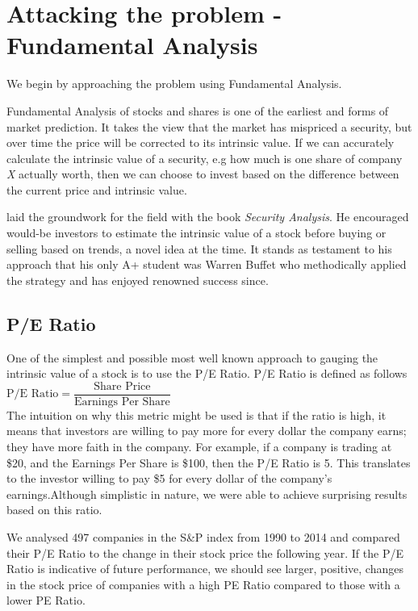 \documentclass{report}
\begin{document}
\section{Attacking the problem - Fundamental Analysis}

We begin by approaching the problem using Fundamental Analysis. 

Fundamental Analysis of stocks and shares is one of the earliest and forms of market prediction. It takes the view that the market has mispriced a security, but over time the price will be corrected to its intrinsic value. If we can accurately calculate the intrinsic value of a security, e.g how much is one share of company \textit{X} actually worth, then we can choose to invest based on the difference between the current price and intrinsic value. 

\citet{graham1934security} laid the groundwork for the field with the book \textit{Security Analysis}. He encouraged would-be investors to estimate the intrinsic value of a stock before buying or selling based on trends, a novel idea at the time. It stands as testament to his approach that his only A+ student was Warren Buffet who methodically applied the strategy and has enjoyed renowned success since. \cite{schroeder2008snowball}

\subsection{P/E Ratio}

One of the simplest and possible most well known approach to gauging the intrinsic value of a stock is to use the P/E Ratio. P/E Ratio is defined as follows\\

\begin{math}
	\text{P/E Ratio} = \dfrac{\text{Share Price}}{\text{Earnings Per Share}}
\end{math}\\

The intuition on why this metric might be used is that if the ratio is high, it means that investors are willing to pay more for every dollar the company earns; they have more faith in the company. For example, if a company is trading at \$20, and the Earnings Per Share is \$100, then the P/E Ratio is 5. This translates to the investor willing to pay \$5 for every dollar of the company's earnings.Although simplistic in nature, we were able to achieve surprising results based on this ratio. 

We analysed 497 companies in the S&P index from 1990 to 2014 and compared their P/E Ratio to the change in their stock price the following year. If the P/E Ratio is indicative of future performance, we should see larger, positive, changes in the stock price of companies with a high PE Ratio compared to those with a lower PE Ratio.
\end{document}
